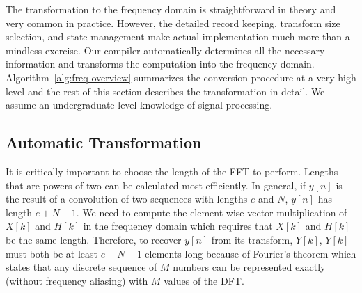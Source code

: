 The transformation to the frequency domain is straightforward in theory and 
very common in practice. However, the detailed record keeping, transform size selection,
and state management make actual implementation much more than a mindless
exercise. Our compiler automatically determines all the necessary
information and transforms the computation into the frequency domain. 
Algorithm~\ref{alg:freq-overview} summarizes the conversion procedure
at a very high level and the rest of this section describes the transformation in 
detail. We assume an undergraduate level knowledge
of signal processing.

\subsection{Automatic Transformation}
\label{sec:method-opt-freq-details}



It is critically important to choose the length of the FFT to perform. 
Lengths that are powers of two can be calculated most efficiently. 
In general, if $y[n]$ is the result of a convolution of 
two sequences with lengths $e$ and $N$, $y[n]$ has length $e+N-1$.
We need to compute the element wise vector multiplication of
$X[k]$ and $H[k]$ in the frequency domain which requires that $X[k]$ and $H[k]$ 
be the same length. Therefore, to recover $y[n]$ from its transform, $Y[k]$, 
$Y[k]$ must both be at least $e+N-1$ elements long because 
of Fourier's theorem which states that any discrete sequence of $M$ numbers 
can be represented exactly (without frequency aliasing) with 
$M$ values of the DFT. 

